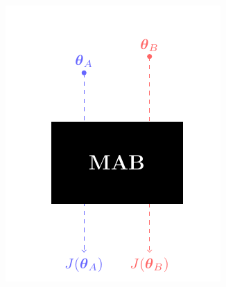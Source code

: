 \documentclass[aspectratio=169, table]{beamer}
\begin{document}
\begin{frame}
\begin{columns}
\begin{column}{.65\textwidth}
\begin{overlayarea}{\textwidth}{\textheight}
{	\includegraphics[]{animation/spaces11.pdf}
}
\end{overlayarea}
\end{column}
\end{columns}
\end{frame}
\end{document}
